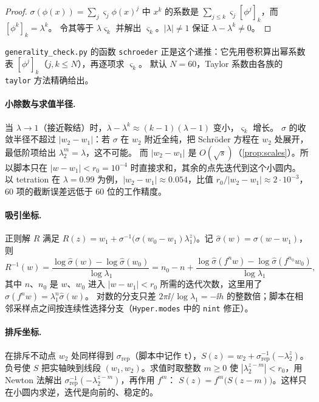 \begin{proof}
$\sigma(\phi(x))=\sum_j\varsigma_j\phi(x)^j$ 中 $x^k$ 的系数是 $\sum_{j\le k}\varsigma_j[\phi^j]_k$，而 $[\phi^k]_k=\lambda^k$。
令其等于 $\lambda\varsigma_k$ 并解出 $\varsigma_k$。$|\lambda|\ne1$ 保证 $\lambda-\lambda^k\ne0$。
\end{proof}

\texttt{generality\_\allowbreak{}check.py} 的函数 \texttt{schroeder} 正是这个递推：它先用卷积算出幂系数表 $[\phi^j]_k$（$j,k\le N$），再逐项求 $\varsigma_k$。
默认 $N=60$，Taylor 系数由各族的 \texttt{taylor} 方法精确给出。

\paragraph{小除数与求值半径.} 当 $\lambda\to1$（接近鞍结）时，$\lambda-\lambda^k\approx(k-1)(\lambda-1)$ 变小，$\varsigma_k$ 增长。
$\sigma$ 的收敛半径不超过 $|w_2-w_1|$：若 $\sigma$ 在 $w_2$ 附近全纯，把 Schr\"oder 方程在 $w_2$ 处展开，最低阶项给出 $\lambda_2^m=\lambda$，这不可能。
而 $|w_2-w_1|$ 是 $O(\sqrt s)$（\cref{prop:scales}）。所以脚本只在 $|w-w_1|<r_0=10^{-4}$ 时直接求和，其余的点先迭代到这个小圆内。
以 tetration 在 $\lambda=0.99$ 为例，$|w_2-w_1|\approx0.054$，比值 $r_0/|w_2-w_1|\approx2\cdot10^{-3}$，60 项的截断误差远低于 60 位的工作精度。

\paragraph{吸引坐标.} 正则解 $R$ 满足 $R(z)=w_1+\sigma^{-1}\bigl(\sigma(w_0-w_1)\lambda_1^z\bigr)$。记 $\hat\sigma(w)=\sigma(w-w_1)$，则
\[
 R^{-1}(w)=\frac{\log\hat\sigma(w)-\log\hat\sigma(w_0)}{\log\lambda_1}
 =n_0-n+\frac{\log\hat\sigma(f^nw)-\log\hat\sigma(f^{n_0}w_0)}{\log\lambda_1},
\]
其中 $n$、$n_0$ 是 $w$、$w_0$ 进入 $|w-w_1|<r_0$ 所需的迭代次数，这里用了 $\hat\sigma(f^nw)=\lambda_1^n\hat\sigma(w)$。
对数的分支只差 $2\pi\ii/\log\lambda_1=-\ii h$ 的整数倍；脚本在相邻采样点之间按连续性选择分支（\texttt{Hyper.modes} 中的 \texttt{nint} 修正）。

\paragraph{排斥坐标.} 在排斥不动点 $w_2$ 处同样得到 $\sigma_{\mathrm{rep}}$（脚本中记作 \texttt{t}），$S(z)=w_2+\sigma_{\mathrm{rep}}^{-1}(-\lambda_2^z)$。
负号使 $S$ 把实轴映到线段 $(w_1,w_2)$。求值时取整数 $m\ge0$ 使 $|\lambda_2^{z-m}|<r_0$，用 Newton 法解出 $\sigma_{\mathrm{rep}}^{-1}(-\lambda_2^{z-m})$，再作用 $f^m$：
$S(z)=f^m\bigl(S(z-m)\bigr)$。这样只在小圆内求逆，迭代是向前的、稳定的。

